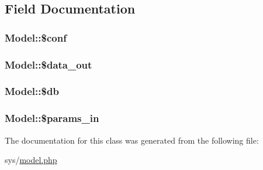 \subsection{Field Documentation}
\hypertarget{classModel_a55228dede8c0844be1f86e456e32df7b}{}
\subsubsection[{\$conf}]{\setlength{\rightskip}{0pt plus 5cm}Model\+::\$conf\hspace{0.3cm}{\ttfamily [protected]}}\label{classModel_a55228dede8c0844be1f86e456e32df7b}
\hypertarget{classModel_a7e3a72683d0252eb2b97ff41b62e3e39}{}
\subsubsection[{\$data\+\_\+out}]{\setlength{\rightskip}{0pt plus 5cm}Model\+::\$data\+\_\+out\hspace{0.3cm}{\ttfamily [protected]}}\label{classModel_a7e3a72683d0252eb2b97ff41b62e3e39}
\hypertarget{classModel_a348093562fd01bcc977cc6659cf7b48f}{}
\subsubsection[{\$db}]{\setlength{\rightskip}{0pt plus 5cm}Model\+::\$db\hspace{0.3cm}{\ttfamily [protected]}}\label{classModel_a348093562fd01bcc977cc6659cf7b48f}
\hypertarget{classModel_aa2c7e134f90e25faef6ab343e6d92718}{}
\subsubsection[{\$params\+\_\+in}]{\setlength{\rightskip}{0pt plus 5cm}Model\+::\$params\+\_\+in\hspace{0.3cm}{\ttfamily [protected]}}\label{classModel_aa2c7e134f90e25faef6ab343e6d92718}


The documentation for this class was generated from the following file\+:\begin{DoxyCompactItemize}
\item 
sys/\hyperlink{model_8php}{model.\+php}\end{DoxyCompactItemize}
